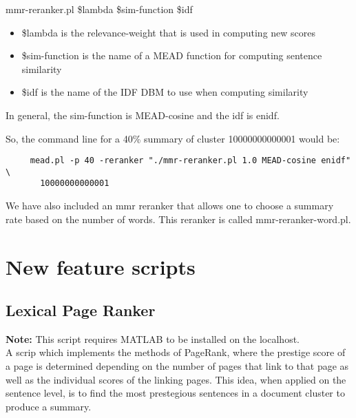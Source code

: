 \documentclass[10pt]{article}
\begin{document}
mmr-reranker.pl \$lambda \$sim-function \$idf

\begin{itemize}

\item \$lambda is the relevance-weight that is used in computing new scores
\item \$sim-function is the name of a MEAD function for computing sentence similarity
\item \$idf is the name of the IDF DBM to use when computing similarity

\end{itemize}

In general, the sim-function is MEAD-cosine and the idf is enidf.

So, the command line for a 40\% summary of cluster 10000000000001 would be:
\begin{verbatim}
     mead.pl -p 40 -reranker "./mmr-reranker.pl 1.0 MEAD-cosine enidf" \
       10000000000001
\end{verbatim}

We have also included an mmr reranker that allows one to choose a summary rate based on 
the number of words.  This reranker is called mmr-reranker-word.pl.

\section{New feature scripts}


\subsection{Lexical Page Ranker}
{\bf Note:} This script requires MATLAB to be installed on the localhost.\\
A scrip which implements the methods of PageRank, where the prestige score of a page is determined depending on the number of pages that link to that page as well as the individual scores of the linking pages.
This idea, when applied on the sentence level, is to find the most prestegious sentences in a document cluster to produce a summary.

\end{document}
